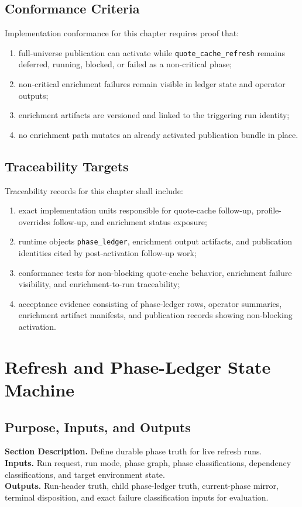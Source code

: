 \documentclass[11pt]{report}
\newcommand{\meta}[3]{\textbf{Section Description.} #1\\
\textbf{Inputs.} #2\\
\textbf{Outputs.} #3\par}
\begin{document}
\section{Conformance Criteria}
Implementation conformance for this chapter requires proof that:
\begin{enumerate}[leftmargin=1.2cm]
    \item full-universe publication can activate while \texttt{quote\_cache\_refresh} remains deferred, running, blocked, or failed as a non-critical phase;
    \item non-critical enrichment failures remain visible in ledger state and operator outputs;
    \item enrichment artifacts are versioned and linked to the triggering run identity;
    \item no enrichment path mutates an already activated publication bundle in place.
\end{enumerate}

\section{Traceability Targets}
Traceability records for this chapter shall include:
\begin{enumerate}[leftmargin=1.2cm]
    \item exact implementation units responsible for quote-cache follow-up, profile-overrides follow-up, and enrichment status exposure;
    \item runtime objects \texttt{phase\_ledger}, enrichment output artifacts, and publication identities cited by post-activation follow-up work;
    \item conformance tests for non-blocking quote-cache behavior, enrichment failure visibility, and enrichment-to-run traceability;
    \item acceptance evidence consisting of phase-ledger rows, operator summaries, enrichment artifact manifests, and publication records showing non-blocking activation.
\end{enumerate}
\chapter{Refresh and Phase-Ledger State Machine}
\section{Purpose, Inputs, and Outputs}
\meta{Define durable phase truth for live refresh runs.}{Run request, run mode, phase graph, phase classifications, dependency classifications, and target environment state.}{Run-header truth, child phase-ledger truth, current-phase mirror, terminal disposition, and exact failure classification inputs for evaluation.}
\end{document}
